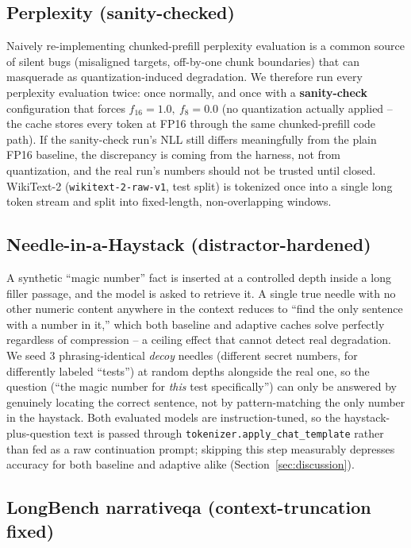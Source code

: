 \documentclass[conference]{IEEEtran}
\begin{document}
\subsection{Perplexity (sanity-checked)}
\label{sec:perplexity}

Naively re-implementing chunked-prefill perplexity evaluation is a common source of
silent bugs (misaligned targets, off-by-one chunk boundaries) that can masquerade as
quantization-induced degradation. We therefore run every perplexity evaluation twice:
once normally, and once with a \textbf{sanity-check} configuration that forces
$f_{16}{=}1.0,\ f_{8}{=}0.0$ (no quantization actually applied -- the cache stores
every token at FP16 through the same chunked-prefill code path). If the sanity-check
run's NLL still differs meaningfully from the plain FP16 baseline, the discrepancy is
coming from the harness, not from quantization, and the real run's numbers should not
be trusted until closed. WikiText-2 (\texttt{wikitext-2-raw-v1}, test split) is
tokenized once into a single long token stream and split into fixed-length,
non-overlapping windows.

\subsection{Needle-in-a-Haystack (distractor-hardened)}
\label{sec:niah}

A synthetic ``magic number'' fact is inserted at a controlled depth inside a long
filler passage, and the model is asked to retrieve it. A single true needle with no
other numeric content anywhere in the context reduces to ``find the only sentence with
a number in it,'' which both baseline and adaptive caches solve perfectly regardless of
compression -- a ceiling effect that cannot detect real degradation. We seed 3
phrasing-identical \emph{decoy} needles (different secret numbers, for differently
labeled ``tests'') at random depths alongside the real one, so the question (``the
magic number for \emph{this} test specifically'') can only be answered by genuinely
locating the correct sentence, not by pattern-matching the only number in the haystack.
Both evaluated models are instruction-tuned, so the haystack-plus-question text is passed
through \texttt{tokenizer.apply\_chat\_template} rather than fed as a raw continuation
prompt; skipping this step measurably depresses accuracy for both baseline and adaptive
alike (Section~\ref{sec:discussion}).

\subsection{LongBench narrativeqa (context-truncation fixed)}
\label{sec:longbench}
\end{document}
